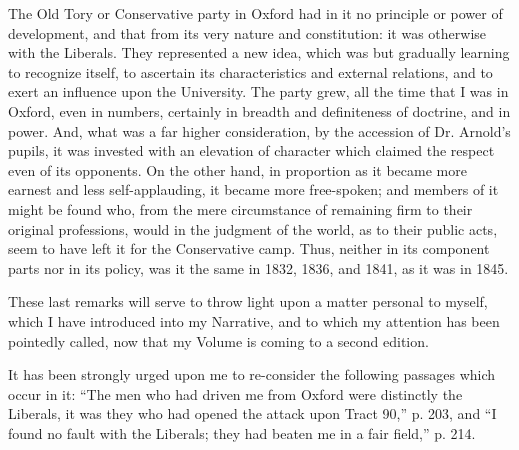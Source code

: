 The Old Tory or Conservative party in Oxford had in it no principle
or power of development, and that from its very nature and constitution:
it was otherwise with the Liberals. They represented a new idea, which
was but gradually learning to recognize itself, to ascertain its characteristics and external relations, and to exert an influence upon
the University. The party grew, all the time that I was in Oxford, even
in numbers, certainly in breadth and definiteness of doctrine, and in
power. And, what was a far higher consideration, by the accession
of Dr. Arnold's pupils, it was invested with an elevation of character
which claimed the respect even of its opponents. On the other hand, in
proportion as it became more earnest and less self-applauding, it became
more free-spoken; and members of it might be found who, from the mere
circumstance of remaining firm to their original professions, would in
the judgment of the world, as to their public acts, seem to have left it
for the Conservative camp. Thus, neither in its component parts nor in
its policy, was it the same in 1832, 1836, and 1841, as it was in 1845.

These last remarks will serve to throw light upon a matter personal
to myself, which I have introduced into my Narrative, and to which my
attention has been pointedly called, now that my Volume is coming to a
second edition.

It has been strongly urged upon me to re-consider the following
passages which occur in it: ``The men who had driven me from Oxford
were distinctly the Liberals, it was they who had opened the attack upon
Tract 90,'' p. 203, and ``I found no fault with the Liberals;
they had beaten me in a fair field,'' p. 214.


